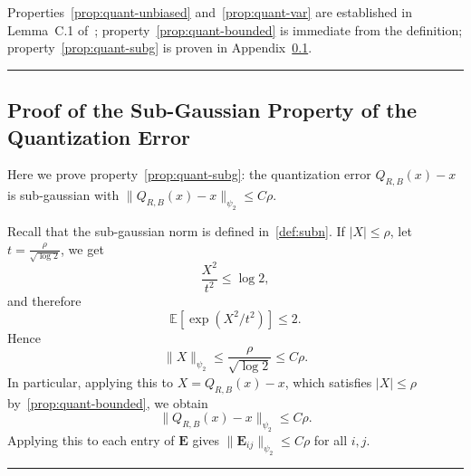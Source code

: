 \documentclass{article}
\newcommand{\Ex}[1]{\mbox{}\mathbb{E}\left[#1\right]}
\newcommand{\Eb}{\mathbf{E}}
\newcommand{\BlackBox}{\rule{1.5ex}{1.5ex}}  %
\newenvironment{proof}{\par\noindent{\bf Proof\ }}{\hfill\BlackBox\par\medskip}
\newcommand{\abr}[1]{\left|#1\right|}
\newcommand{\norm}[1]{\|#1\|}
\begin{document}
\begin{proof}
    Properties~\eqref{prop:quant-unbiased} and~\eqref{prop:quant-var} are established in Lemma~C.1 of~\citep{saha2023matrix}; property~\eqref{prop:quant-bounded} is immediate from the definition; property~\eqref{prop:quant-subg} is proven in Appendix~\ref{app:quant-subg}.
\end{proof}
\subsection{Proof of the Sub-Gaussian Property of the Quantization Error}
\label{app:quant-subg}

Here we prove property~\eqref{prop:quant-subg}: the quantization error $Q_{R,B}(x) - x$ is sub-gaussian with $\norm{Q_{R,B}(x) - x}_{\psi_2} \le C\rho$.

\begin{proof}
Recall that the sub-gaussian norm is defined in~\eqref{def:subn}.
If $\abr{X}\le\rho$, let $t=\frac{\rho}{\sqrt{\log 2}}$, we get
\begin{equation}
    \frac{X^2}{t^2}\le \log 2,
\end{equation}
and therefore
\begin{equation}
    \Ex{\exp(X^2/t^2)}\le 2.
\end{equation}
Hence
\begin{equation}
    \norm{X}_{\psi_2}\le \frac{\rho}{\sqrt{\log 2}}\le C\rho.
\end{equation}
In particular, applying this to $X = Q_{R,B}(x) - x$, which satisfies $\abr{X} \le \rho$ by~\eqref{prop:quant-bounded}, we obtain
\begin{equation}
    \norm{Q_{R,B}(x) - x}_{\psi_2}\le C\rho.
\end{equation}
Applying this to each entry of $\Eb$ gives $\norm{\Eb_{ij}}_{\psi_2} \le C\rho$ for all $i, j$.
\end{proof}
\end{document}
